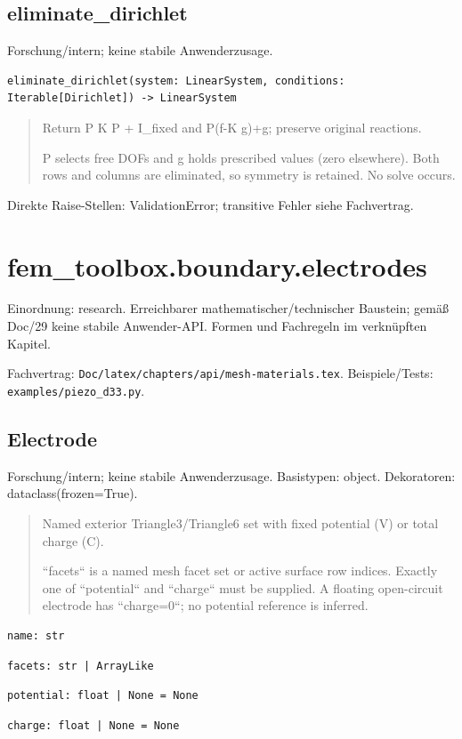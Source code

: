 \subsection{eliminate\_dirichlet}
Forschung/intern; keine stabile Anwenderzusage.
\begin{lstlisting}
eliminate_dirichlet(system: LinearSystem, conditions: Iterable[Dirichlet]) -> LinearSystem
\end{lstlisting}
\begin{quote}
Return P K P + I\_fixed and P(f-K g)+g; preserve original reactions.\par P selects free DOFs and g holds prescribed values (zero elsewhere). Both rows and columns are eliminated, so symmetry is retained. No solve occurs.
\end{quote}
Direkte Raise-Stellen: ValidationError; transitive Fehler siehe Fachvertrag.
\section{fem\_toolbox.boundary.electrodes}
Einordnung: research. Erreichbarer mathematischer/technischer Baustein; gemäß Doc/29 keine stabile Anwender-API. Formen und Fachregeln im verknüpften Kapitel.
\par Fachvertrag: \nolinkurl{Doc/latex/chapters/api/mesh-materials.tex}. Beispiele/Tests:
\nolinkurl{examples/piezo_d33.py}.
\subsection{Electrode}
Forschung/intern; keine stabile Anwenderzusage.
Basistypen: object. Dekoratoren: dataclass(frozen=True).
\begin{quote}
Named exterior Triangle3/Triangle6 set with fixed potential (V) or total charge (C).\par ``facets`` is a named mesh facet set or active surface row indices. Exactly one of ``potential`` and ``charge`` must be supplied. A floating open-circuit electrode has ``charge=0``; no potential reference is inferred.
\end{quote}
\begin{lstlisting}
name: str
\end{lstlisting}
\begin{lstlisting}
facets: str | ArrayLike
\end{lstlisting}
\begin{lstlisting}
potential: float | None = None
\end{lstlisting}
\begin{lstlisting}
charge: float | None = None
\end{lstlisting}
